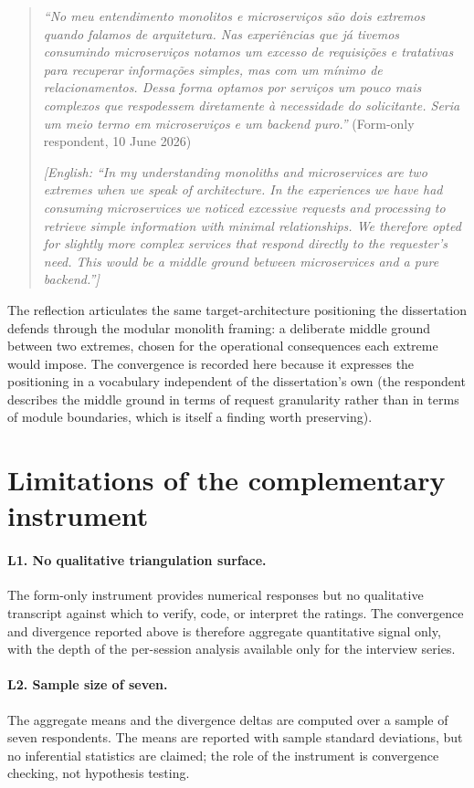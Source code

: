 \begin{quote}
\emph{``No meu entendimento monolitos e microservi\c{c}os s\~ao dois extremos quando falamos de arquitetura. Nas experi\^encias que j\'a tivemos consumindo microservi\c{c}os notamos um excesso de requisi\c{c}\~oes e tratativas para recuperar informa\c{c}\~oes simples, mas com um m\'inimo de relacionamentos. Dessa forma optamos por servi\c{c}os um pouco mais complexos que respodessem diretamente \`a necessidade do solicitante. Seria um meio termo em microservi\c{c}os e um backend puro.''} (Form-only respondent, 10 June 2026)

\emph{[English: ``In my understanding monoliths and microservices are two extremes when we speak of architecture. In the experiences we have had consuming microservices we noticed excessive requests and processing to retrieve simple information with minimal relationships. We therefore opted for slightly more complex services that respond directly to the requester's need. This would be a middle ground between microservices and a pure backend.'']}
\end{quote}

\noindent
The reflection articulates the same target-architecture positioning the dissertation defends through the modular monolith framing: a deliberate middle ground between two extremes, chosen for the operational consequences each extreme would impose. The convergence is recorded here because it expresses the positioning in a vocabulary independent of the dissertation's own (the respondent describes the middle ground in terms of request granularity rather than in terms of module boundaries, which is itself a finding worth preserving).

\section*{Limitations of the complementary instrument}

\paragraph*{L1. No qualitative triangulation surface.} The form-only instrument provides numerical responses but no qualitative transcript against which to verify, code, or interpret the ratings. The convergence and divergence reported above is therefore aggregate quantitative signal only, with the depth of the per-session analysis available only for the interview series.

\paragraph*{L2. Sample size of seven.} The aggregate means and the divergence deltas are computed over a sample of seven respondents. The means are reported with sample standard deviations, but no inferential statistics are claimed; the role of the instrument is convergence checking, not hypothesis testing.

